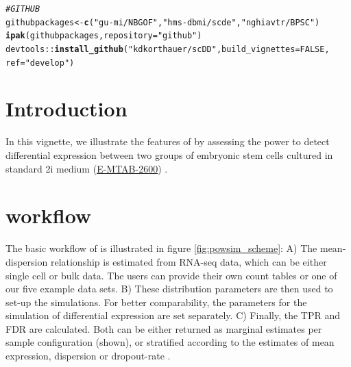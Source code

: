 \documentclass{article}\usepackage[]{graphicx}\usepackage[usenames,dvipsnames]{color}
\makeatletter
\newcommand{\hlnum}[1]{\textcolor[rgb]{0.686,0.059,0.569}{#1}}%
\newcommand{\hlstr}[1]{\textcolor[rgb]{0.192,0.494,0.8}{#1}}%
\newcommand{\hlcom}[1]{\textcolor[rgb]{0.678,0.584,0.686}{\textit{#1}}}%
\newcommand{\hlopt}[1]{\textcolor[rgb]{0,0,0}{#1}}%
\newcommand{\hlstd}[1]{\textcolor[rgb]{0.345,0.345,0.345}{#1}}%
\newcommand{\hlkwb}[1]{\textcolor[rgb]{0.69,0.353,0.396}{#1}}%
\newcommand{\hlkwc}[1]{\textcolor[rgb]{0.333,0.667,0.333}{#1}}%
\newcommand{\hlkwd}[1]{\textcolor[rgb]{0.737,0.353,0.396}{\textbf{#1}}}%
\newenvironment{kframe}{%
 \def\at@end@of@kframe{}%
 \ifinner\ifhmode%
  \def\at@end@of@kframe{\end{minipage}}%
  \begin{minipage}{\columnwidth}%
 \fi\fi%
 \def\FrameCommand##1{\hskip\@totalleftmargin \hskip-\fboxsep
 \colorbox{shadecolor}{##1}\hskip-\fboxsep
     \hskip-\linewidth \hskip-\@totalleftmargin \hskip\columnwidth}%
 \MakeFramed {\advance\hsize-\width
   \@totalleftmargin\z@ \linewidth\hsize
   \@setminipage}}%
 {\par\unskip\endMakeFramed%
 \at@end@of@kframe}
\newenvironment{knitrout}{}{} %
\makeatother
\begin{document}
\begin{knitrout}
\begin{kframe}
\begin{alltt}
\hlcom{# GITHUB}
\hlstd{githubpackages} \hlkwb{<-} \hlkwd{c}\hlstd{(}\hlstr{"gu-mi/NBGOF"}\hlstd{,} \hlstr{"hms-dbmi/scde"}\hlstd{,} \hlstr{"nghiavtr/BPSC"}\hlstd{)}
\hlkwd{ipak}\hlstd{(githubpackages,} \hlkwc{repository} \hlstd{=} \hlstr{"github"}\hlstd{)}
\hlstd{devtools}\hlopt{::}\hlkwd{install_github}\hlstd{(}\hlstr{"kdkorthauer/scDD"}\hlstd{,} \hlkwc{build_vignettes} \hlstd{=} \hlnum{FALSE}\hlstd{,}
    \hlkwc{ref} \hlstd{=} \hlstr{"develop"}\hlstd{)}
\end{alltt}
\end{kframe}
\end{knitrout}

\section{Introduction}

In this vignette, we illustrate the features of  by assessing the power to detect differential expression between two groups of embryonic stem cells cultured in standard 2i medium (\href{http://www.ebi.ac.uk/arrayexpress/experiments/E-MTAB-2600/}{E-MTAB-2600}) \cite{Kolodziejczyk2015-vn}.

\section{ workflow}

The basic workflow of  is illustrated in figure \ref{fig:powsim_scheme}: A) The mean-dispersion relationship is estimated from RNA-seq data, which can be either single cell or bulk data. The users can provide their own count tables or one of our five example data sets. B) These distribution parameters are then used to set-up the simulations. For better comparability, the parameters for the simulation of differential expression are set separately. C) Finally, the TPR and FDR are calculated. Both can be either returned as marginal estimates per sample configuration (shown), or stratified according to the estimates of mean expression, dispersion or dropout-rate .
\end{document}
